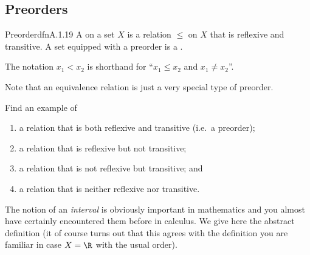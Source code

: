 \subsection{Preorders}

\begin{dfn}{Preorder}{dfnA.1.19}
A  on a set $X$ is a relation $\leq$ on $X$ that is reflexive and transitive.  A set equipped with a preorder is a .
\begin{rmk}
The notation $x_1<x_2$ is shorthand for ``$x_1\leq x_2$ and $x_1\neq x_2$''.
\end{rmk}
\begin{rmk}
Note that an equivalence relation is just a very special type of preorder.
\end{rmk}
\end{dfn}
\begin{exr}{}{}
Find an example of
\begin{enumerate}
\item a relation that is both reflexive and transitive (i.e.~a preorder);
\item a relation that is reflexive but not transitive;
\item a relation that is not reflexive but transitive; and
\item a relation that is neither reflexive nor transitive.
\end{enumerate}
\end{exr}
The notion of an \emph{interval} is obviously important in mathematics and you almost have certainly encountered them before in calculus.  We give here the abstract definition (it of course turns out that this agrees with the definition you are familiar in case $X=\R$ with the usual order).
